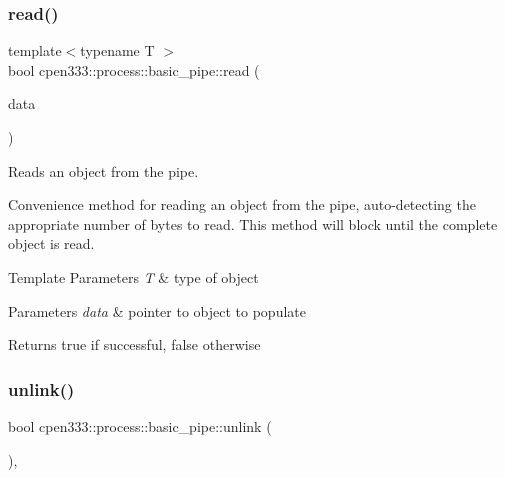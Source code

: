 \subsubsection{\texorpdfstring{read()}{read()}\hspace{0.1cm}{\footnotesize\ttfamily [2/2]}}
{\footnotesize\ttfamily template$<$typename T $>$ \\
bool cpen333\+::process\+::basic\+\_\+pipe\+::read (\begin{DoxyParamCaption}\item[{T $\ast$}]{data }\end{DoxyParamCaption})\hspace{0.3cm}{\ttfamily [inline]}}



Reads an object from the pipe. 

Convenience method for reading an object from the pipe, auto-\/detecting the appropriate number of bytes to read. This method will block until the complete object is read.


\begin{DoxyTemplParams}{Template Parameters}
{\em T} & type of object \\
\hline
\end{DoxyTemplParams}

\begin{DoxyParams}{Parameters}
{\em data} & pointer to object to populate \\
\hline
\end{DoxyParams}
\begin{DoxyReturn}{Returns}
true if successful, false otherwise 
\end{DoxyReturn}
\mbox{\label{classcpen333_1_1process_1_1basic__pipe_a344a8291b20be973ade784922bdf37eb}} 
\subsubsection{\texorpdfstring{unlink()}{unlink()}\hspace{0.1cm}{\footnotesize\ttfamily [1/2]}}
{\footnotesize\ttfamily bool cpen333\+::process\+::basic\+\_\+pipe\+::unlink (\begin{DoxyParamCaption}{ }\end{DoxyParamCaption})\hspace{0.3cm}{\ttfamily [inline]}, {\ttfamily [virtual]}}



